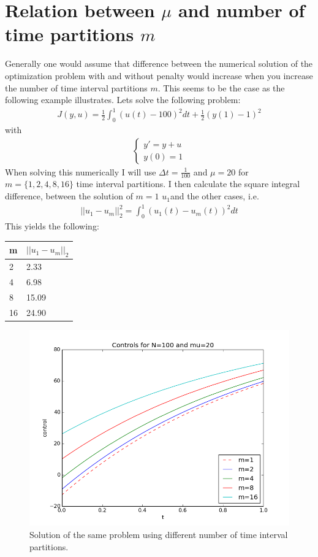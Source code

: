 \documentclass[11pt,a4paper]{article}
\begin{document}
\section*{Relation between $\mu$ and number of time partitions $m$}
Generally one would assume that difference between the numerical solution of the optimization problem with and without penalty would increase when you increase the number of time interval partitions $m$. This seems to be the case as the following example illustrates. Lets solve the following problem:
\begin{align*}
J(y,u) =\frac{1}{2} \int_0^1 (u(t)-100)^2dt + \frac{1}{2}(y(1)-1)^2
\end{align*}  
with 
\begin{align*}
\left\{
     \begin{array}{lr}
       	y' =  y +u\\
       	   y(0)=1
     \end{array}
   \right.
\end{align*}
When solving this numerically I will use $\Delta t= \frac{1}{100}$ and $\mu=20$ for $m=\{1,2,4,8,16\}$ time interval partitions. I then calculate the square integral difference, between the solution of $m=1$ $u_1$and the other cases, i.e.
\begin{align*}
||u_1-u_m||_2^2 = \int_0^1 (u_1(t)-u_m(t))^2dt
\end{align*} 
This yields the following:
\begin{center}
    \begin{tabular}{| l | l |}
    \hline
    m & $ ||u_1-u_m||_2$ \\ \hline
    2 & 2.33\\ \hline
    4 & 6.98\\ \hline
    8 & 15.09\\ \hline
    16 & 24.90 \\ \hline
    \end{tabular}
\end{center}
\begin{figure}
  \includegraphics[width=\linewidth]{m_plots.png}
  \caption{Solution of the same problem using different number of time interval partitions.}
  \label{Fig 6}
\end{figure}
\end{document}

